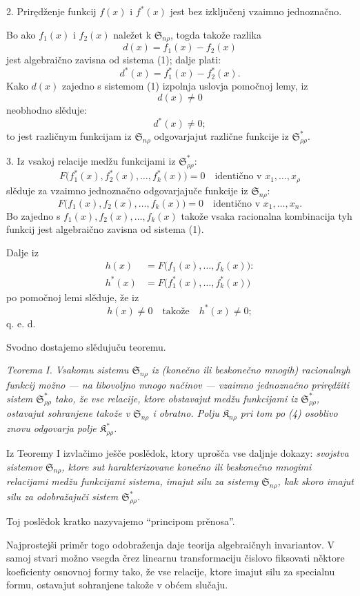 \documentclass[11pt]{article}
\providecommand{\Kfield}{\mathfrak{K}}
\providecommand{\Ssys}{\mathfrak{S}}
\begin{document}
2. Prirędženje funkcij $f(x)$ i $f^*(x)$ jest bez izključenj vzaimno jednoznačno.

Bo ako $f_1(x)$ i $f_2(x)$ naležet k $\Ssys_{n\rho}$, togda takože razlika
\[
  d(x)=f_1(x)-f_2(x)
\]
jest algebraično zavisna od sistema (1); dalje plati:
\[
  d^*(x)=f_1^*(x)-f_2^*(x).
\]
Kako $d(x)$ zajedno s sistemom (1) izpolnja uslovja pomočnoj lemy, iz
\[
  d(x)\ne0
\]
neobhodno slěduje:
\[
  d^*(x)\ne0;
\]
to jest različnym funkcijam iz $\Ssys_{n\rho}$ odgovarjajut različne funkcije iz $\Ssys^*_{\rho\rho}$.

3. Iz vsakoj relacije medžu funkcijami iz $\Ssys^*_{\rho\rho}$:
\[
  F\bigl(f_1^*(x),f_2^*(x),\ldots,f_k^*(x)\bigr)=0
  \quad\text{identično v }x_1,\ldots,x_\rho
\]
slěduje za vzaimno jednoznačno odgovarjajuče funkcije iz $\Ssys_{n\rho}$:
\[
  F\bigl(f_1(x),f_2(x),\ldots,f_k(x)\bigr)=0
  \quad\text{identično v }x_1,
\ldots,x_n.
\]
Bo zajedno s $f_1(x),f_2(x),\ldots,f_k(x)$ takože vsaka racionalna kombinacija tyh funkcij jest algebraično zavisna od sistema (1).

Dalje iz
\begin{equation}
\begin{aligned}
 h(x)&=F\bigl(f_1(x),\ldots,f_k(x)\bigr):\\
 h^*(x)&=F\bigl(f_1^*(x),\ldots,f_k^*(x)\bigr)
\end{aligned}
\tag{4}
\end{equation}
po pomočnoj lemi slěduje, že iz
\[
  h(x)\ne0\quad\text{takože}\quad h^*(x)\ne0;
\]
q. e. d.

Svodno dostajemo slědujuču teoremu.

{\itshape Teorema I. Vsakomu sistemu $\Ssys_{n\rho}$ iz (konečno ili beskonečno mnogih) racionalnyh funkcij možno --- na libovoljno mnogo načinov --- vzaimno jednoznačno prirędžiti sistem $\Ssys^*_{\rho\rho}$ tako, že vse relacije, ktore obstavajut medžu funkcijami iz $\Ssys^*_{\rho\rho}$, ostavajut sohranjene takože v $\Ssys_{n\rho}$ i obratno. Polju $\Kfield_{n\rho}$ pri tom po (4) osoblivo znovu odgovarja polje $\Kfield^*_{\rho\rho}$.}

Iz Teoremy I izvlačimo ješče poslědok, ktory uprošča vse daljnje dokazy: {\itshape svojstva sistemov $\Ssys_{n\rho}$, ktore sut harakterizovane konečno ili beskonečno mnogimi relacijami medžu funkcijami sistema, imajut silu za sistemy $\Ssys_{n\rho}$, kak skoro imajut silu za odobražajuči sistem $\Ssys^*_{\rho\rho}$.}

Toj poslědok kratko nazyvajemo ``principom prěnosa''.

\providecommand{\Lsys}{\mathfrak{L}}
\providecommand{\Jdom}{\mathfrak{J}}

\clearpage
Najprostejši priměr togo odobraženja daje teorija algebraičnyh invariantov. V samoj stvari možno vsegda črez linearnu transformaciju čislovo fiksovati něktore koeficienty osnovnoj formy tako, že vse relacije, ktore imajut silu za specialnu formu, ostavajut sohranjene takože v obćem slučaju.
\end{document}
